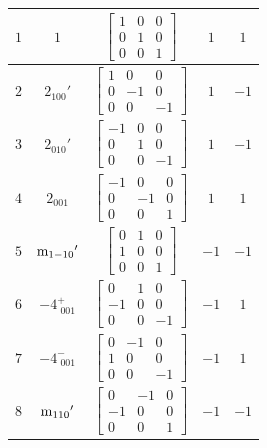 \documentclass[fleqn,8pt]{jsarticle}
\begin{document}
\begin{longtable}{ccccc}
$ 1 $ & $ 1 $ & $ \begin{bmatrix} 1 & 0 & 0 \\ 0 & 1 & 0 \\ 0 & 0 & 1 \end{bmatrix} $ & $ 1 $ & $ 1 $ \\ \hline
$ 2 $ & $ 2{}_{100}{}' $ & $ \begin{bmatrix} 1 & 0 & 0 \\ 0 & -1 & 0 \\ 0 & 0 & -1 \end{bmatrix} $ & $ 1 $ & $ -1 $ \\ \hline
$ 3 $ & $ 2{}_{010}{}' $ & $ \begin{bmatrix} -1 & 0 & 0 \\ 0 & 1 & 0 \\ 0 & 0 & -1 \end{bmatrix} $ & $ 1 $ & $ -1 $ \\ \hline
$ 4 $ & $ 2{}_{001} $ & $ \begin{bmatrix} -1 & 0 & 0 \\ 0 & -1 & 0 \\ 0 & 0 & 1 \end{bmatrix} $ & $ 1 $ & $ 1 $ \\ \hline
$ 5 $ & $ {\rm m}_{1-10}{}' $ & $ \begin{bmatrix} 0 & 1 & 0 \\ 1 & 0 & 0 \\ 0 & 0 & 1 \end{bmatrix} $ & $ -1 $ & $ -1 $ \\ \hline
$ 6 $ & $ -4^{+}_{\,\,001} $ & $ \begin{bmatrix} 0 & 1 & 0 \\ -1 & 0 & 0 \\ 0 & 0 & -1 \end{bmatrix} $ & $ -1 $ & $ 1 $ \\ \hline
$ 7 $ & $ -4^{-}_{\,\,001} $ & $ \begin{bmatrix} 0 & -1 & 0 \\ 1 & 0 & 0 \\ 0 & 0 & -1 \end{bmatrix} $ & $ -1 $ & $ 1 $ \\ \hline
$ 8 $ & $ {\rm m}_{110}{}' $ & $ \begin{bmatrix} 0 & -1 & 0 \\ -1 & 0 & 0 \\ 0 & 0 & 1 \end{bmatrix} $ & $ -1 $ & $ -1 $ \\ \hline

\end{longtable}
\end{document}
